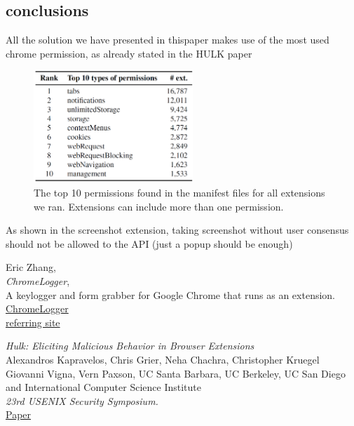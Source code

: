 \documentclass[12pt]{article}
\begin{document}
\begin{multicols}{2}
\section*{conclusions}
All the solution we have presented in thispaper makes use of the most used chrome permission, as already stated in the HULK paper\cite{HULK}
\begin{figure}[H]
	\begin{center}
		\includegraphics[width=6cm]{permission.png}
		\caption{The top 10 permissions found in the manifest
			files for all extensions we ran. Extensions can include			
			more than one permission.}
	\end{center}
\end{figure}
As shown in the screenshot extension, taking screenshot without user consensus should not be allowed to the API (just a popup should be enough)
\begin{thebibliography}{2}
	Eric Zhang,\\
	\emph{ChromeLogger},\\
A keylogger and form grabber for Google Chrome that runs as an extension.\\
\href{https://github.com/Xeroday/ChromeLogger}{ChromeLogger}\\
\href{https://www.ericzhang.me/projects/chromelogger/}{referring site}

\emph{Hulk: Eliciting Malicious Behavior in Browser Extensions}\\
Alexandros Kapravelos, Chris Grier, Neha Chachra, Christopher Kruegel
Giovanni Vigna, Vern Paxson,
UC Santa Barbara,
UC Berkeley, 
UC San Diego and 
International Computer Science Institute\\
\emph{23rd USENIX Security Symposium.}\\
\href{https://www.usenix.org/system/files/conference/usenixsecurity14/sec14-paper-kapravelos.pdf}{Paper}\\	
\end{thebibliography}
\end{multicols}
 
\end{document}
